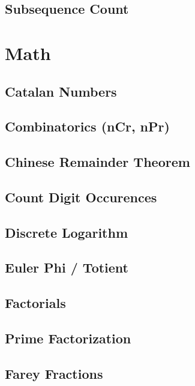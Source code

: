 \documentclass[landscape, 10pt]{article}
\begin{document}
\begin{multicols}{4}
\subsection{Subsequence Count}


\section{Math}
\subsection{Catalan Numbers}

\subsection{Combinatorics (nCr, nPr)}

\subsection{Chinese Remainder Theorem}

\subsection{Count Digit Occurences}

\subsection{Discrete Logarithm}

\subsection{Euler Phi / Totient}

\subsection{Factorials}

\subsection{Prime Factorization}

\subsection{Farey Fractions}


\end{multicols}
\end{document}
